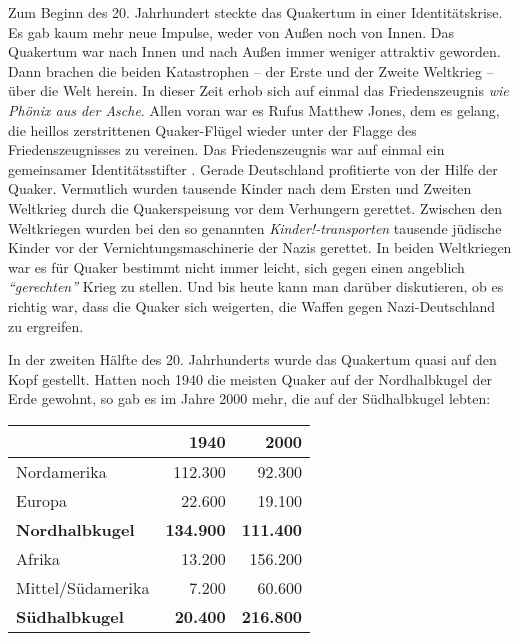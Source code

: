 Zum Beginn des 20. Jahrhundert steckte das Quakertum in einer Identitätskrise.
Es gab kaum mehr neue Impulse, weder von Außen
noch von Innen. Das Quakertum war
nach Innen und nach Außen immer weniger attraktiv geworden. Dann brachen die
beiden Katastrophen -- der Erste und der Zweite Weltkrieg --
über die Welt
herein. In dieser Zeit erhob sich auf einmal das Friedenszeugnis
\textit{wie
Phönix aus der Asche}. Allen voran war es Rufus Matthew Jones,
 dem
es gelang, die heillos zerstrittenen Quaker-Flügel wieder unter der Flagge des
Friedenszeugnisses zu vereinen. Das Friedenszeugnis war auf einmal ein
gemeinsamer Identitätsstifter . Gerade Deutschland
 profitierte von der Hilfe der
Quaker. Vermutlich wurden tausende Kinder nach dem Ersten und Zweiten Weltkrieg
durch die Quakerspeisung  vor dem Verhungern gerettet.
Zwischen den Weltkriegen
wurden bei den so genannten \textit{Kinder!-transporten}
tausende jüdische Kinder 
vor der Vernichtungsmaschinerie der Nazis gerettet. In beiden Weltkriegen war es
für Quaker bestimmt nicht immer leicht, sich gegen einen
angeblich \textit{"`gerechten"'}
Krieg zu stellen. Und bis heute kann man darüber diskutieren, ob es richtig
war, dass die Quaker sich weigerten, die Waffen gegen Nazi-Deutschland zu
ergreifen.

\medskip

In der zweiten Hälfte des 20. Jahrhunderts wurde das Quakertum quasi auf den
Kopf
gestellt. Hatten noch 1940 die meisten Quaker auf der Nordhalbkugel der Erde
gewohnt, so gab es im Jahre 2000 mehr, die auf der Südhalbkugel lebten:

\begin{center}
\begin{tabular}{|l|r|r|} \hline
                        & \textbf{1940}        & \textbf{2000}    \\ \hline
\hline
Nordamerika             & 112.300              & 92.300           \\ \hline
Europa                  & 22.600               & 19.100           \\ \hline
\textbf{Nordhalbkugel}  & \textbf{134.900}     & \textbf{111.400} \\ \hline
Afrika                  & 13.200               & 156.200          \\ \hline
Mittel/Südamerika       & 7.200                & 60.600           \\ \hline
\textbf{Südhalbkugel}   & \textbf{20.400}      & \textbf{216.800} \\ \hline
\end{tabular}
\end{center}


